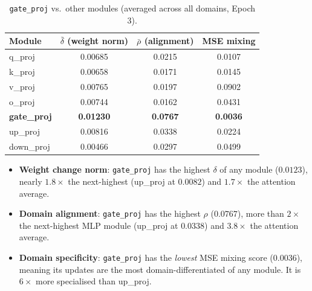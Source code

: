 \documentclass[11pt,a4paper]{article}
\begin{document}
\begin{table}[H]
\centering
\caption{\texttt{gate\_proj} vs.\ other modules (averaged across all domains, Epoch 3).}
\label{tab:gate}
\begin{tabular}{lccc}
\toprule
Module & $\bar{\delta}$ (weight norm) & $\bar{\rho}$ (alignment) & MSE mixing \\
\midrule
q\_proj     & 0.00685 & 0.0215 & 0.0107 \\
k\_proj     & 0.00658 & 0.0171 & 0.0145 \\
v\_proj     & 0.00765 & 0.0197 & 0.0902 \\
o\_proj     & 0.00744 & 0.0162 & 0.0431 \\
\midrule
\textbf{gate\_proj} & \textbf{0.01230} & \textbf{0.0767} & \textbf{0.0036} \\
up\_proj    & 0.00816 & 0.0338 & 0.0224 \\
down\_proj  & 0.00466 & 0.0297 & 0.0499 \\
\bottomrule
\end{tabular}
\end{table}

\begin{itemize}
    \item \textbf{Weight change norm}: \texttt{gate\_proj} has the highest $\delta$ of any module ($0.0123$), nearly $1.8\times$ the next-highest (up\_proj at $0.0082$) and $1.7\times$ the attention average.
    \item \textbf{Domain alignment}: \texttt{gate\_proj} has the highest $\rho$ ($0.0767$), more than $2\times$ the next-highest MLP module (up\_proj at $0.0338$) and $3.8\times$ the attention average.
    \item \textbf{Domain specificity}: \texttt{gate\_proj} has the \emph{lowest} MSE mixing score ($0.0036$), meaning its updates are the most domain-differentiated of any module. It is $6\times$ more specialised than up\_proj.
\end{itemize}
\end{document}
